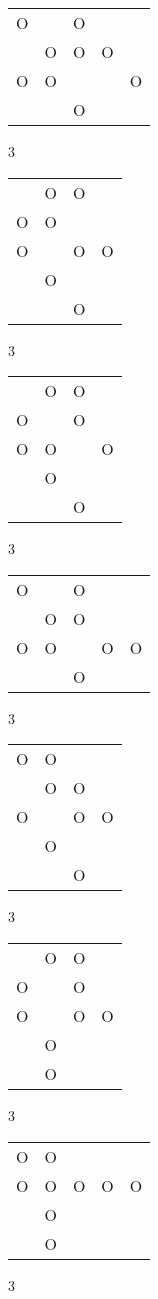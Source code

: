 \begin{tabular}{|m{0.2cm}m{0.2cm}m{0.2cm}m{0.2cm}m{0.2cm}|}\hline
O& &O& & \\
 &O&O&O& \\
O&O& & &O\\
 & &O& & \\
\hline\end{tabular}3
\begin{tabular}{|m{0.2cm}m{0.2cm}m{0.2cm}m{0.2cm}|}\hline
 &O&O& \\
O&O& & \\
O& &O&O\\
 &O& & \\
 & &O& \\
\hline\end{tabular}3
\begin{tabular}{|m{0.2cm}m{0.2cm}m{0.2cm}m{0.2cm}|}\hline
 &O&O& \\
O& &O& \\
O&O& &O\\
 &O& & \\
 & &O& \\
\hline\end{tabular}3
\begin{tabular}{|m{0.2cm}m{0.2cm}m{0.2cm}m{0.2cm}m{0.2cm}|}\hline
O& &O& & \\
 &O&O& & \\
O&O& &O&O\\
 & &O& & \\
\hline\end{tabular}3
\begin{tabular}{|m{0.2cm}m{0.2cm}m{0.2cm}m{0.2cm}|}\hline
O&O& & \\
 &O&O& \\
O& &O&O\\
 &O& & \\
 & &O& \\
\hline\end{tabular}3
\begin{tabular}{|m{0.2cm}m{0.2cm}m{0.2cm}m{0.2cm}|}\hline
 &O&O& \\
O& &O& \\
O& &O&O\\
 &O& & \\
 &O& & \\
\hline\end{tabular}3
\begin{tabular}{|m{0.2cm}m{0.2cm}m{0.2cm}m{0.2cm}m{0.2cm}|}\hline
O&O& & & \\
O&O&O&O&O\\
 &O& & & \\
 &O& & & \\
\hline\end{tabular}3

